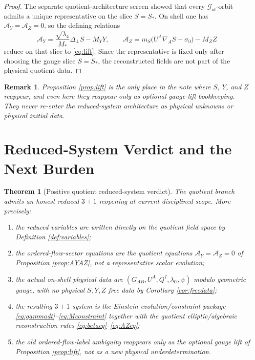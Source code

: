 \documentclass[11pt]{article}
\newcommand{\AY}{\mathcal A_Y}
\newcommand{\AZ}{\mathcal A_Z}
\newcommand{\GaugeGroup}{\mathscr G_{\mathrm{of}}}
\newtheorem{remark}{Remark}
\newtheorem{theorem}{Theorem}
\begin{document}
\begin{proof}
The separate quotient-architecture screen showed that every \(\GaugeGroup\)-orbit admits a unique representative on the slice \(S=S_*\). On shell one has \(\AY=\AZ=0\), so the defining relations
\[
\AY
=
\frac{\sqrt{\lambda_4}}{M_*}\Delta_\perp S-M_YY,
\qquad
\AZ
=
m_S\bigl(U^A\nabla_A S-\sigma_0\bigr)-M_ZZ
\]
reduce on that slice to \eqref{eq:lift}. Since the representative is fixed only after choosing the gauge slice \(S=S_*\), the reconstructed fields are not part of the physical quotient data.
\end{proof}

\begin{remark}
Proposition \ref{prop:lift} is the only place in the note where \(S\), \(Y\), and \(Z\) reappear, and even here they reappear only as optional gauge-lift bookkeeping. They never re-enter the reduced-system architecture as physical unknowns or physical initial data.
\end{remark}

\section{Reduced-System Verdict and the Next Burden}

\begin{theorem}[Positive quotient reduced-system verdict]
\label{thm:verdict}
The quotient branch admits an honest reduced \(3+1\) reopening at current disciplined scope. More precisely:
\begin{enumerate}
    \item the reduced variables are written directly on the quotient field space by Definition \ref{def:variables};
    \item the ordered-flow-sector equations are the quotient equations \(\AY=\AZ=0\) of Proposition \ref{prop:AYAZ}, not a representative scalar evolution;
    \item the actual on-shell physical data are \((G_{AB},U^A,Q^I,\lambda_U,\psi)\) modulo geometric gauge, with no physical \(S,Y,Z\) free data by Corollary \ref{cor:freedata};
    \item the resulting \(3+1\) system is the Einstein evolution/constraint package \eqref{eq:gammadt}--\eqref{eq:Mconstraint} together with the quotient elliptic/algebraic reconstruction rules \eqref{eq:betaeq}--\eqref{eq:AZeq};
    \item the old ordered-flow-label ambiguity reappears only as the optional gauge lift of Proposition \ref{prop:lift}, not as a new physical underdetermination.
\end{enumerate}
\end{theorem}
\end{document}
